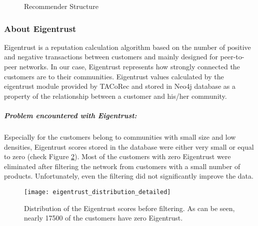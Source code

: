 \label{eigentrust_section}
	\begin{figure}[H]
		\centering
		\caption{Recommender Structure}
		\label{fig:eigentrust_structure}
	\end{figure}
	\subsubsection{About Eigentrust} \label{about_eigentrust}
	Eigentrust\cite{Eigentrust} is a reputation calculation algorithm based on the number of positive and negative transactions between customers and mainly designed for peer-to-peer networks. In our case, Eigentrust represents how strongly connected the customers are to their communities. Eigentrust values calculated by the eigentrust module provided by TACoRec\cite{Tacorec} and stored in Neo4j database as a property of the relationship between a customer and his/her community. 
	\subparagraph{Problem encountered with Eigentrust:}
	Especially for the customers belong to communities with small size and low densities, Eigentrust scores stored in the database were either very small or equal to zero (check Figure \ref{fig:eigentrust_distribution_figure}). Most of the customers with zero Eigentrust were eliminated after filtering the network from customers with a small number of products. Unfortunately, even the filtering did not significantly improve the data.
	\begin{figure}[H]
		\centering
		\texttt{[image: eigentrust\_distribution\_detailed]}
		\caption{Distribution of the Eigentrust scores before filtering. As can be seen, nearly 17500 of the customers have zero Eigentrust.}
		\label{fig:eigentrust_distribution_figure}
	\end{figure}

